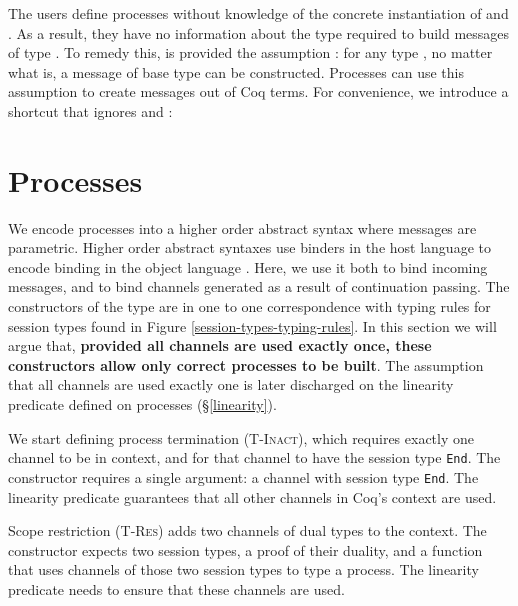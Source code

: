 \documentclass{mproj}
\newcommand{\type}{\texttt}
\newcommand{\End}{\type{End}}
\begin{document}
The users define processes without knowledge of the concrete instantiation of  and . As a result, they have no information about the type  required to build messages of type . To remedy this,  is provided the assumption : for any type , no matter what  is, a message of base type  can be constructed. Processes can use this assumption to create messages out of Coq terms. For convenience, we introduce a shortcut that ignores  and :


\section{Processes}\label{processes}

We encode processes into a higher order abstract syntax where messages are parametric. Higher order abstract syntaxes use binders in the host language to encode binding in the object language \cite{Chlipala2008}. Here, we use it both to bind incoming messages, and to bind channels generated as a result of continuation passing. The constructors of the  type are in one to one correspondence with typing rules for session types found in Figure \ref{session-types-typing-rules}. In this section we will argue that, \textbf{provided all channels are used exactly once, these constructors allow only correct processes to be built}. The assumption that all channels are used exactly one is later discharged on the linearity predicate defined on processes (\S \ref{linearity}).

We start defining process termination (\textsc{T-Inact}), which requires exactly one channel to be in context, and for that channel to have the session type \End. The constructor  requires a single argument: a channel with session type \End. The linearity predicate guarantees that all other channels in Coq's context are used.


Scope restriction (\textsc{T-Res}) adds two channels of dual types to the context. The constructor  expects two session types, a proof of their duality, and a function that uses channels of those two session types to type a process. The linearity predicate needs to ensure that these channels are used.
\end{document}
